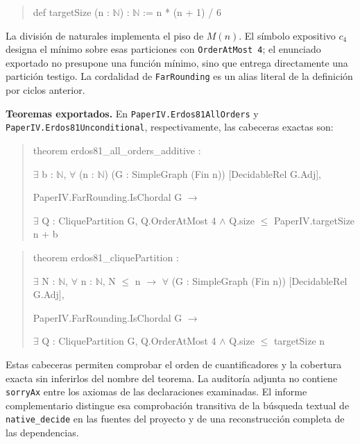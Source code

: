 \documentclass[spanish,11pt,a4paper]{article}
\begin{document}
\begin{quote}\footnotesize\ttfamily\raggedright
def targetSize (n : \(\mathbb N\)) : \(\mathbb N\) := n * (n + 1) / 6\par
\end{quote}

La división de naturales implementa el piso de \(M(n)\). El símbolo expositivo \(c_4\) designa el mínimo sobre esas particiones con \texttt{OrderAtMost\ 4}; el enunciado exportado no presupone una función mínimo, sino que entrega directamente una partición testigo. La cordalidad de \nolinkurl{FarRounding} es un alias literal de la definición por ciclos anterior.

\textbf{Teoremas exportados.} En \nolinkurl{PaperIV.Erdos81AllOrders} y \nolinkurl{PaperIV.Erdos81Unconditional}, respectivamente, las cabeceras exactas son:

\begin{quote}\footnotesize\ttfamily\raggedright
theorem erdos81\_all\_orders\_additive :\par
    \(\exists\) b : \(\mathbb N\), \(\forall\) (n : \(\mathbb N\)) (G : SimpleGraph (Fin n)) [DecidableRel G.Adj],\par
      PaperIV.FarRounding.IsChordal G \(\to\)\par
        \(\exists\) Q : CliquePartition G, Q.OrderAtMost 4 \(\land\) Q.size \(\le\) PaperIV.targetSize n + b\par
\end{quote}

\begin{quote}\footnotesize\ttfamily\raggedright
theorem erdos81\_cliquePartition :\par
    \(\exists\) N : \(\mathbb N\), \(\forall\) n : \(\mathbb N\), N \(\le\) n \(\to\) \(\forall\) (G : SimpleGraph (Fin n)) [DecidableRel G.Adj],\par
      PaperIV.FarRounding.IsChordal G \(\to\)\par
        \(\exists\) Q : CliquePartition G, Q.OrderAtMost 4 \(\land\) Q.size \(\le\) targetSize n\par
\end{quote}

Estas cabeceras permiten comprobar el orden de cuantificadores y la cobertura exacta sin inferirlos del nombre del teorema. La auditoría adjunta no contiene \nolinkurl{sorryAx} entre los axiomas de las declaraciones examinadas. El informe complementario distingue esa comprobación transitiva de la búsqueda textual de \nolinkurl{native_decide} en las fuentes del proyecto y de una reconstrucción completa de las dependencias.
\end{document}
